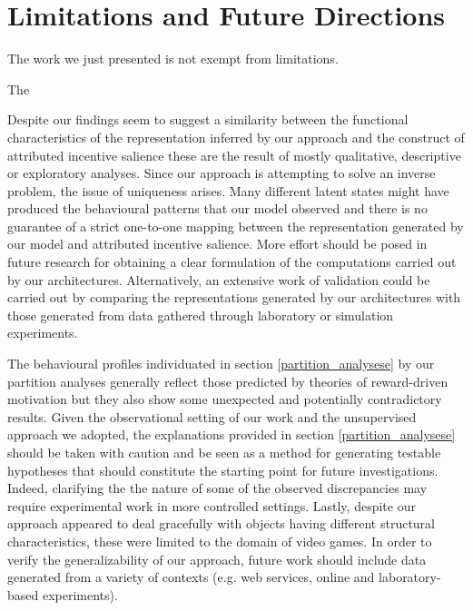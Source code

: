 \section{Limitations and Future Directions}
\label{discussion_limitations}
The work we just presented is not exempt from limitations. 

The 

Despite our findings seem to suggest a similarity between the functional characteristics of the representation inferred by our approach and the construct of attributed incentive salience these are the result of mostly qualitative, descriptive or exploratory analyses. 
Since our approach is attempting to solve an inverse problem, the issue of uniqueness arises. Many different latent states might have produced the behavioural patterns that our model observed and there is no guarantee of a strict one-to-one mapping between the representation generated by our model and attributed incentive salience.  More effort should be posed in future research for obtaining a clear formulation of the computations carried out by our architectures. Alternatively, an extensive work of validation could be carried out by comparing the representations generated by our architectures with those generated from data gathered through laboratory or simulation experiments. 

The behavioural profiles individuated in section \ref{partition_analysese} by our partition analyses generally reflect those predicted by theories of reward-driven motivation \cite{thorndike1927law,skinner1965science,berridge2004motivation} but they also show some unexpected and potentially contradictory results. Given the observational setting of our work and the unsupervised approach we adopted, the explanations provided in section \ref{partition_analysese} should be taken with caution and be seen as a method for generating testable hypotheses that should constitute the starting point for future investigations. Indeed, clarifying the the nature of some of the observed discrepancies may require experimental work in more controlled settings. Lastly, despite our approach appeared to deal gracefully with objects having different structural characteristics, these were limited to the domain of video games. In order to verify the generalizability of our approach, future work should include data generated from a variety of contexts (e.g. web services, online and laboratory-based experiments).  

